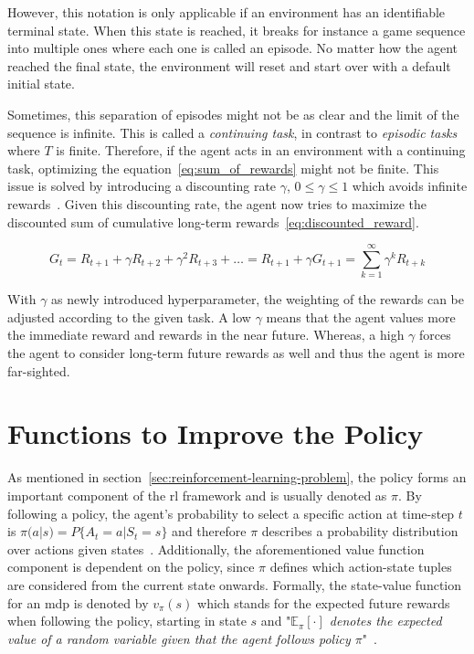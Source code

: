 \documentclass[draft,final]{vutinfth} %
\newcommand{\p}[1]{see p. #1}
\begin{document}
    However, this notation is only applicable if an environment has an identifiable terminal state.
    When this state is reached, it breaks for instance a game sequence into multiple ones where each one is called an episode.
    No matter how the agent reached the final state, the environment will reset and start over with a default initial state.

    Sometimes, this separation of episodes might not be as clear and the limit of the sequence is infinite.
    This is called a \textit{continuing task}, in contrast to \textit{episodic tasks} where $T$ is finite.
    Therefore, if the agent acts in an environment with a continuing task, optimizing the equation~\eqref{eq:sum_of_rewards} might not be finite.
    This issue is solved by introducing a discounting rate $\gamma$, $0 \leq \gamma \leq 1$ which avoids infinite rewards~\citep{sutton_reinforcement_2018}.
    Given this discounting rate, the agent now tries to maximize the discounted sum of cumulative long-term rewards~\eqref{eq:discounted_reward}.

    \begin{equation}
        G_t = R_{t+1} + \gamma R_{t+2}+ \gamma^2 R_{t+3} + \ldots = R_{t+1} + \gamma G_{t+1} = \sum_{k=1}^{\infty} \gamma^k R_{t+k}\label{eq:discounted_reward}
    \end{equation}

    With $\gamma$ as newly introduced hyperparameter, the weighting of the rewards can be adjusted according to the given task.
    A low $\gamma$ means that the agent values more the immediate reward and rewards in the near future.
    Whereas, a high $\gamma$ forces the agent to consider long-term future rewards as well and thus the agent is more far-sighted.


    \section{Functions to Improve the Policy}\label{sec:functions-to-improve-the-policy}
    As mentioned in section~\ref{sec:reinforcement-learning-problem}, the policy forms an important component of the \gls{rl} framework and is usually denoted as $\pi$.
    By following a policy, the agent's probability to select a specific action at time-step $t$ is $\pi(a|s) = P\{A_t=a|S_t=s\}$ and therefore $\pi$ describes a probability distribution over actions given states~.
    Additionally, the aforementioned value function component is dependent on the policy, since $\pi$ defines which action-state tuples are considered from the current state onwards.
    Formally, the state-value function for an \gls{mdp} is denoted by $v_\pi(s)$ which stands for the expected future rewards when following the policy, starting in state $s$ and "\textit{$\mathbb{E}_\pi[\cdot]$ denotes the expected value of a random variable given that the agent follows policy $\pi$}"~\citep[\p{58}]{sutton_reinforcement_2018}.
\end{document}
